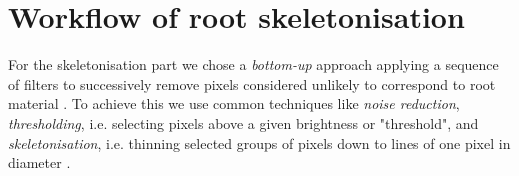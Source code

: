 %
%
%


\section{Workflow of root skeletonisation}\label{sec:workflow}

For the skeletonisation part we chose a \textit{bottom-up} approach applying a sequence of filters to successively remove pixels considered unlikely to correspond to root material \cite{pound2013rootnav}. To achieve this we use common techniques like \textit{noise reduction}, \textit{thresholding}, i.e. selecting pixels above a given brightness or "threshold", and \textit{skeletonisation}, i.e. thinning selected groups of pixels down to lines of one pixel in diameter \cite{pound2013rootnav}. 

